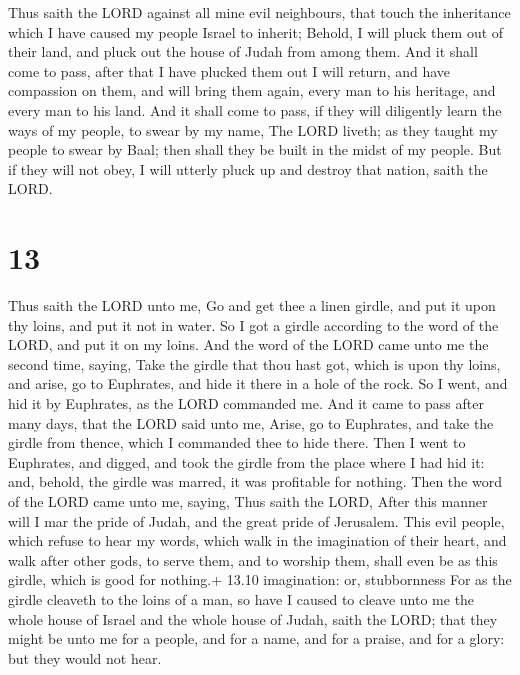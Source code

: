  Thus saith the LORD against all mine evil neighbours,
that touch the inheritance which I have caused my people Israel to
inherit; Behold, I will pluck them out of their land, and pluck out the
house of Judah from among them.  And it shall come to pass,
after that I have plucked them out I will return, and have compassion on
them, and will bring them again, every man to his heritage, and every
man to his land.  And it shall come to pass, if they will
diligently learn the ways of my people, to swear by my name, The LORD
liveth; as they taught my people to swear by Baal; then shall they be
built in the midst of my people.  But if they will not
obey, I will utterly pluck up and destroy that nation, saith the LORD.

\hypertarget{section-12}{%
\section{13}\label{section-12}}

 Thus saith the LORD unto me, Go and get thee a linen
girdle, and put it upon thy loins, and put it not in water. 
So I got a girdle according to the word of the LORD, and put it on my
loins.  And the word of the LORD came unto me the second
time, saying,  Take the girdle that thou hast got, which is
upon thy loins, and arise, go to Euphrates, and hide it there in a hole
of the rock.  So I went, and hid it by Euphrates, as the
LORD commanded me.  And it came to pass after many days,
that the LORD said unto me, Arise, go to Euphrates, and take the girdle
from thence, which I commanded thee to hide there.  Then I
went to Euphrates, and digged, and took the girdle from the place where
I had hid it: and, behold, the girdle was marred, it was profitable for
nothing.  Then the word of the LORD came unto me, saying,
 Thus saith the LORD, After this manner will I mar the pride
of Judah, and the great pride of Jerusalem.  This evil
people, which refuse to hear my words, which walk in the imagination of
their heart, and walk after other gods, to serve them, and to worship
them, shall even be as this girdle, which is good for nothing.+ 13.10
imagination: or, stubbornness  For as the girdle cleaveth
to the loins of a man, so have I caused to cleave unto me the whole
house of Israel and the whole house of Judah, saith the LORD; that they
might be unto me for a people, and for a name, and for a praise, and for
a glory: but they would not hear.

